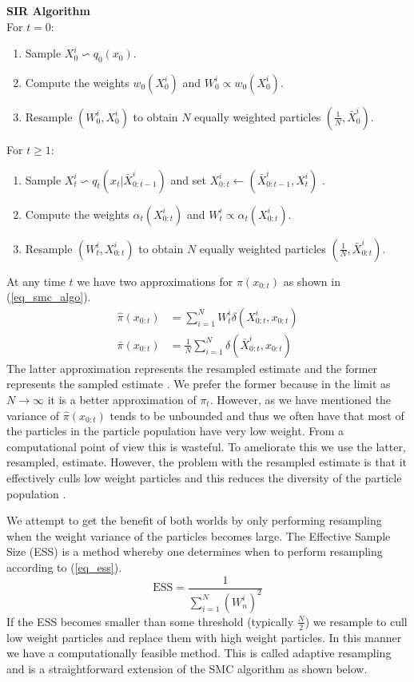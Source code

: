 \textbf{SIR Algorithm} \\
For $t=0$:
\begin{enumerate}
\item
Sample $X^i_0 \backsim q_0(x_0)$.
\item
Compute the weights $w_0(X_0^i)$ and $W^i_0 \propto w_0(X^i_0)$.
\item
Resample $(W^i_0, X^i_0)$ to obtain $N$ equally weighted particles $(\frac{1}{N}, \bar{X}^i_0)$.
\end{enumerate}
For $t \geq 1$:
\begin{enumerate}
\item
Sample $X^i_t \backsim q_t(x_t|\bar{X}^i_{0:t-1})$ and set ${X}^i_{0:t} \leftarrow (\bar{X}^i_{0:t-1}, X^i_t)$ .
\item
Compute the weights $\alpha_t(X^i_{0:t})$ and $W^i_t \propto \alpha_t(X^i_{0:t})$.
\item
Resample $(W^i_t, X^i_{0:t})$ to obtain $N$ equally weighted particles $(\frac{1}{N}, \bar{X}^i_{0:t})$.
\end{enumerate}
At any time $t$ we have two approximations for $\pi(x_{0:t})$ as shown in (\ref{eq_smc_algo}).
\begin{equation}
\begin{aligned}
\hat{\pi}(x_{0:t}) &= \sum_{i=1}^N W^i_t \delta(X^i_{0:t}, x_{0:t}) \\
\bar{\pi}(x_{0:t}) &= \frac{1}{N}\sum_{i=1}^N \delta(\bar{X}^i_{0:t}, x_{0:t})
\end{aligned}
\label{eq_smc_algo}
\end{equation}
The latter approximation represents the resampled estimate and the former represents the sampled estimate \cite{pftut}. We prefer the former because in the limit as $N \rightarrow \infty$ it is a better approximation of $\pi_t$. However, as we have mentioned the variance of $\hat{\pi}(x_{0:t})$ tends to be unbounded and thus we often have that most of the particles in the particle population have very low weight. From a computational point of view this is wasteful. To ameliorate this we use the latter, resampled, estimate. However, the problem with the resampled estimate is that it effectively culls low weight particles and this reduces the diversity of the particle population \cite{murphy1}. 

We attempt to get the benefit of both worlds by only performing resampling when the weight variance of the particles becomes large. The Effective Sample Size (ESS) is a method whereby one determines when to perform resampling according to (\ref{eq_ess}).
\begin{equation}
\text{ESS} = \frac{1}{\sum_{i=1}^N (W^i_n)^2}
\label{eq_ess}
\end{equation} 
If the ESS becomes smaller than some threshold (typically $\frac{N}{2}$) we resample to cull low weight particles and replace them with high weight particles. In this manner we have a computationally feasible method. This is called adaptive resampling and is a straightforward extension of the SMC algorithm as shown below.


